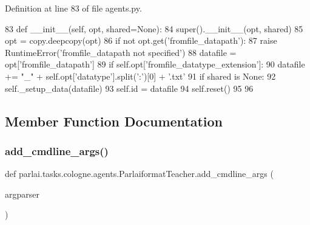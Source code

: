 Definition at line 83 of file agents.\+py.


\begin{DoxyCode}
83     \textcolor{keyword}{def }\_\_init\_\_(self, opt, shared=None):
84         super().\_\_init\_\_(opt, shared)
85         opt = copy.deepcopy(opt)
86         \textcolor{keywordflow}{if} \textcolor{keywordflow}{not} opt.get(\textcolor{stringliteral}{'fromfile\_datapath'}):
87             \textcolor{keywordflow}{raise} RuntimeError(\textcolor{stringliteral}{'fromfile\_datapath not specified'})
88         datafile = opt[\textcolor{stringliteral}{'fromfile\_datapath'}]
89         \textcolor{keywordflow}{if} self.opt[\textcolor{stringliteral}{'fromfile\_datatype\_extension'}]:
90             datafile += \textcolor{stringliteral}{"\_"} + self.opt[\textcolor{stringliteral}{'datatype'}].split(\textcolor{stringliteral}{':'})[0] + \textcolor{stringliteral}{'.txt'}
91         \textcolor{keywordflow}{if} shared \textcolor{keywordflow}{is} \textcolor{keywordtype}{None}:
92             self.\_setup\_data(datafile)
93         self.id = datafile
94         self.reset()
95 
96 
\end{DoxyCode}


\subsection{Member Function Documentation}
\mbox{\label{classparlai_1_1tasks_1_1cologne_1_1agents_1_1ParlaiformatTeacher_aa7751152b46ca44ceb7f4bce0d951502}} 
\subsubsection{\texorpdfstring{add\+\_\+cmdline\+\_\+args()}{add\_cmdline\_args()}}
{\footnotesize\ttfamily def parlai.\+tasks.\+cologne.\+agents.\+Parlaiformat\+Teacher.\+add\+\_\+cmdline\+\_\+args (\begin{DoxyParamCaption}\item[{}]{argparser }\end{DoxyParamCaption})\hspace{0.3cm}{\ttfamily [static]}}



